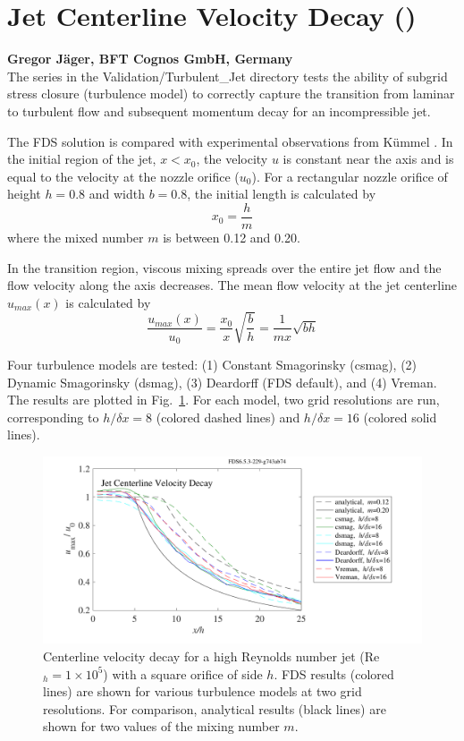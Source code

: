 \documentclass[11pt]{book}
\begin{document}
\section{Jet Centerline Velocity Decay (\texorpdfstring{}{jet})}

\textbf{Gregor J\"ager, BFT Cognos GmbH, Germany}\\

\noindent The  series in the Validation/Turbulent\_Jet directory tests the ability of subgrid stress closure (turbulence model) to correctly capture the transition from laminar to turbulent flow and subsequent momentum decay for an incompressible jet.

The FDS solution is compared with experimental observations from K\"ummel \cite{Kummel:2007}. In the initial region of the jet, $x<x_0$, the velocity $u$ is constant near the axis and is equal to the velocity at the nozzle orifice ($u_0$). For a rectangular nozzle orifice of height $h = 0.8$ and width $b = 0.8$, the initial length is calculated by
\begin{equation}
x_0 = \frac{h}{m}
\end{equation}
where the mixed number $m$ is between 0.12 and 0.20.

In the transition region, viscous mixing spreads over the entire jet flow and the flow velocity along the axis decreases. The mean flow velocity at the jet centerline $u_{max}(x)$ is calculated by
\begin{equation}
\frac{u_{max}(x)}{u_0} = \frac{x_0}{x}\sqrt{\frac{b}{h}} = \frac{1}{mx} \sqrt{bh}
\end{equation}

Four turbulence models are tested: (1) Constant Smagorinsky (csmag), (2) Dynamic Smagorinsky (dsmag), (3) Deardorff (FDS default), and (4) Vreman.  The results are plotted in Fig.~\ref{fig_jet_decay}. For each model, two grid resolutions are run, corresponding to $h/\delta x = 8$ (colored dashed lines) and $h/\delta x=16$ (colored solid lines).
\begin{figure}[h]
\centering
\includegraphics[width=.8\textwidth]{SCRIPT_FIGURES/jet_decay}
\caption[Jet centerline velocity decay]{Centerline velocity decay for a high Reynolds number jet (Re$_h = 1 \times 10^5$) with a square orifice of side $h$.  FDS results (colored lines) are shown for various turbulence models at two grid resolutions.  For comparison, analytical results (black lines) are shown for two values of the mixing number $m$.}
\label{fig_jet_decay}
\end{figure}
\end{document}
